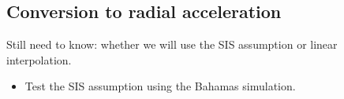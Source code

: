 \documentclass[fleqn,usenatbib]{mnras}
\newcommand{\am}{\, {\rm arcmin}}
\newcommand*{\E}[1]{\times 10^{#1}}
\begin{document}

\subsection{Conversion to radial acceleration}
\label{sec:conversion}
Still need to know: whether we will use the SIS assumption or linear interpolation.
\begin{itemize}
	\item Test the SIS assumption using the Bahamas simulation.
\end{itemize}
	
\end{document}
